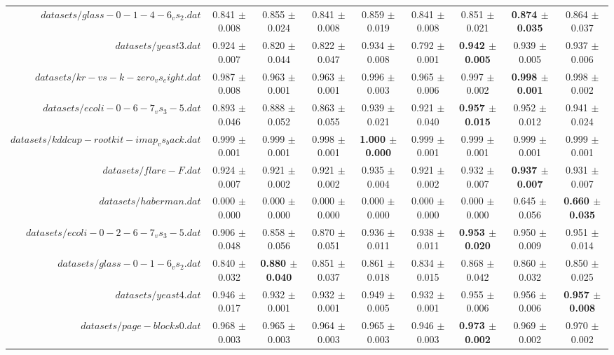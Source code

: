 \begin{table}[!ht]
{\begin{tabular}{r c c c c c c c c}
$datasets/glass-0-1-4-6_vs_2.dat$ & 0.841 $\pm$ 0.008 & 0.855 $\pm$ 0.024 & 0.841 $\pm$ 0.008 & 0.859 $\pm$ 0.019 & 0.841 $\pm$ 0.008 & 0.851 $\pm$ 0.021 & \textbf{0.874 $\pm$ 0.035} & 0.864 $\pm$ 0.037 \\
$datasets/yeast3.dat$ & 0.924 $\pm$ 0.007 & 0.820 $\pm$ 0.044 & 0.822 $\pm$ 0.047 & 0.934 $\pm$ 0.008 & 0.792 $\pm$ 0.001 & \textbf{0.942 $\pm$ 0.005} & 0.939 $\pm$ 0.005 & 0.937 $\pm$ 0.006 \\
$datasets/kr-vs-k-zero_vs_eight.dat$ & 0.987 $\pm$ 0.008 & 0.963 $\pm$ 0.001 & 0.963 $\pm$ 0.001 & 0.996 $\pm$ 0.003 & 0.965 $\pm$ 0.006 & 0.997 $\pm$ 0.002 & \textbf{0.998 $\pm$ 0.001} & 0.998 $\pm$ 0.002 \\
$datasets/ecoli-0-6-7_vs_3-5.dat$ & 0.893 $\pm$ 0.046 & 0.888 $\pm$ 0.052 & 0.863 $\pm$ 0.055 & 0.939 $\pm$ 0.021 & 0.921 $\pm$ 0.040 & \textbf{0.957 $\pm$ 0.015} & 0.952 $\pm$ 0.012 & 0.941 $\pm$ 0.024 \\
$datasets/kddcup-rootkit-imap_vs_back.dat$ & 0.999 $\pm$ 0.001 & 0.999 $\pm$ 0.001 & 0.998 $\pm$ 0.001 & \textbf{1.000 $\pm$ 0.000} & 0.999 $\pm$ 0.001 & 0.999 $\pm$ 0.001 & 0.999 $\pm$ 0.001 & 0.999 $\pm$ 0.001 \\
$datasets/flare-F.dat$ & 0.924 $\pm$ 0.007 & 0.921 $\pm$ 0.002 & 0.921 $\pm$ 0.002 & 0.935 $\pm$ 0.004 & 0.921 $\pm$ 0.002 & 0.932 $\pm$ 0.007 & \textbf{0.937 $\pm$ 0.007} & 0.931 $\pm$ 0.007 \\
$datasets/haberman.dat$ & 0.000 $\pm$ 0.000 & 0.000 $\pm$ 0.000 & 0.000 $\pm$ 0.000 & 0.000 $\pm$ 0.000 & 0.000 $\pm$ 0.000 & 0.000 $\pm$ 0.000 & 0.645 $\pm$ 0.056 & \textbf{0.660 $\pm$ 0.035} \\
$datasets/ecoli-0-2-6-7_vs_3-5.dat$ & 0.906 $\pm$ 0.048 & 0.858 $\pm$ 0.056 & 0.870 $\pm$ 0.051 & 0.936 $\pm$ 0.011 & 0.938 $\pm$ 0.011 & \textbf{0.953 $\pm$ 0.020} & 0.950 $\pm$ 0.009 & 0.951 $\pm$ 0.014 \\
$datasets/glass-0-1-6_vs_2.dat$ & 0.840 $\pm$ 0.032 & \textbf{0.880 $\pm$ 0.040} & 0.851 $\pm$ 0.037 & 0.861 $\pm$ 0.018 & 0.834 $\pm$ 0.015 & 0.868 $\pm$ 0.042 & 0.860 $\pm$ 0.032 & 0.850 $\pm$ 0.025 \\
$datasets/yeast4.dat$ & 0.946 $\pm$ 0.017 & 0.932 $\pm$ 0.001 & 0.932 $\pm$ 0.001 & 0.949 $\pm$ 0.005 & 0.932 $\pm$ 0.001 & 0.955 $\pm$ 0.006 & 0.956 $\pm$ 0.006 & \textbf{0.957 $\pm$ 0.008} \\
$datasets/page-blocks0.dat$ & 0.968 $\pm$ 0.003 & 0.965 $\pm$ 0.003 & 0.964 $\pm$ 0.003 & 0.965 $\pm$ 0.003 & 0.946 $\pm$ 0.003 & \textbf{0.973 $\pm$ 0.002} & 0.969 $\pm$ 0.002 & 0.970 $\pm$ 0.002 \\

\end{tabular}}
\end{table}
